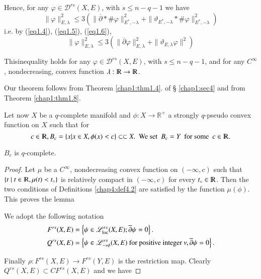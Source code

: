 Hence, for any $\varphi \in \mathscr{D}^{rs} (X,E)$, with $s \leq
n-q-1$ we have 
$$ 
\|\varphi \|^2 _{E, \lambda} \leq 3 ( \| \overline{\partial}\ast \#
\varphi \|^2 _{E^\ast , -\lambda}+ \| \vartheta_{E^\ast, -\lambda} \ast \#
\varphi \| ^2_{E^\ast, -\lambda})
$$ 
i.e. by (\ref{eq1.4}), (\ref{eq1.5}), (\ref{eq1.6}), 
$$
\| \varphi \|^2 _{E,\lambda}\leq 3 (\| \overline{\partial} \varphi \|
^2 _{E,\lambda} + \| \vartheta_{E,\lambda}\varphi \|^2)
$$

This\pageoriginale inequality holds for any $\varphi \in
\mathscr{D}^{rs} (X,E)$, 
with $s \leq n - q - 1$, and for any $C^\infty$, nondecreasing, convex
function $\lambda : \varmathbb{R} \rightarrow  \varmathbb{R}$. 

Our theorem follows from Theorem \ref{chap1:thm1.4}. of \S
\ref{chap1:sec4} and from Theorem \ref{chap1:thm1.8}.   

Let now $X$ be a $q$-complete manifold and $\phi : X \rightarrow
\mathbb{R}^+$ a strongly $q$-pseudo convex function on $X$ such that
for   
$$
c \in  \varmathbb{R}, B_c = \{x| x \in X, \phi (x) < c \}\subset
\subset X. ~\text{ We set }~ B_c =Y ~\text{ for some }~ c \in
\varmathbb{R}.
$$

\begin{lemma}\label{chap4:lem4.7}%
  $B_c$ is $q$-complete.
\end{lemma}

\begin{proof}
  Let $\mu$ be a $C^\infty$, nondecreasing convex function on
  $(-\infty, c)$ such that $\{t \mid t \in  \varmathbb{R}, \mu (t)
  < t_\circ \}$ is relatively compact in $(-\infty , c)$ for every
  $t_\circ \in  \varmathbb{R}$. Then the two conditions of Definitions
  \ref{chap4:def4.2} are satisfied by the function $\mu (\phi)$. This proves the
  lemma  

  We adopt the following notation
  \begin{align*}
  F^{rs} (X,E) & = \left\{ \psi \in \mathscr{L}^{rs}_{\operatorname{loc}}(X,E);
  \overline{\partial} \psi =0 \right\}.\\
Q^{rs} (X,E) & = \left\{ \psi \in \mathscr{L}^{rs}_{-\nu \phi} (X,E)
  \text{ for positive integer  } \nu, \overline{\partial}\psi =0
  \right \}.
  \end{align*}

  Finally $\rho : F^{rs} (X,E) \rightarrow F^{rs}(Y,E)$ is the
  restriction map. Clearly $Q^{rs} (X,E) \subset C F^{rs} (X,E)$ and we
  have 
\end{proof}

